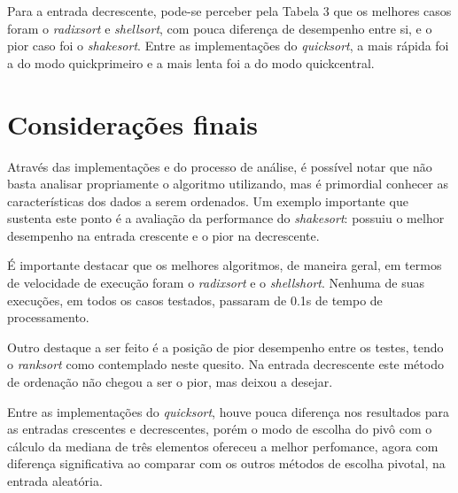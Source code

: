 \documentclass[
	article,			%
	11pt,				%
	oneside,			%
	a4paper,			%
	english,			%
	brazil,				%
	sumario=tradicional
	]{abntex2}
\begin{document}
Para a entrada decrescente, pode-se perceber pela Tabela 3 que os melhores casos foram o \emph{radixsort} e \emph{shellsort}, com pouca diferença de desempenho entre si, e o pior caso foi o \emph{shakesort}. Entre as implementações do \emph{quicksort}, a mais rápida foi a do modo quickprimeiro e a mais lenta foi a do modo quickcentral.

% 

\section*{Considerações finais}

Através das implementações e do processo de análise, é possível notar que não basta analisar propriamente o algoritmo utilizando, mas é primordial conhecer as características dos dados a serem ordenados. Um exemplo importante que sustenta este ponto é a avaliação da performance do \emph{shakesort}: possuiu o melhor desempenho na entrada crescente e o pior na decrescente.

É importante destacar que os melhores algoritmos, de maneira geral, em termos de velocidade de execução foram o \emph{radixsort} e o \emph{shellshort}. Nenhuma de suas execuções, em todos os casos testados, passaram de 0.1s de tempo de processamento.

Outro destaque a ser feito é a posição de pior desempenho entre os testes, tendo o \emph{ranksort} como contemplado neste quesito. Na entrada decrescente este método de ordenação não chegou a ser o pior, mas deixou a desejar.

Entre as implementações do \emph{quicksort}, houve pouca diferença nos resultados para as entradas crescentes e decrescentes, porém o modo de escolha do pivô com o cálculo da mediana de três elementos ofereceu a melhor perfomance, agora com diferença significativa ao comparar com os outros métodos de escolha pivotal, na entrada aleatória.

\postextual



\emptythanks
\maketitle
\end{document}
